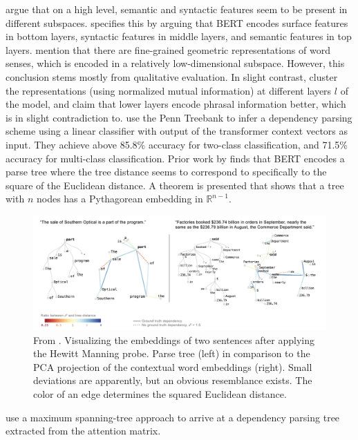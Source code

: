 \documentclass[a4paper,12pt,oneside,openright]{report}
\begin{document}
\cite{coenen19} argue that on a high level, semantic and syntactic features seem to be present in different subspaces.
\cite{jawahar19} specifies this by arguing that BERT encodes surface features in bottom layers, syntactic features in middle layers, and semantic features in top layers.
\cite{coenen19} mention that there are fine-grained geometric representations of word senses, which is encoded in a relatively low-dimensional subspace.
However, this conclusion stems mostly from qualitative evaluation.
In slight contrast, \cite{jawahar19} cluster the representations (using normalized mutual information) at different layers $l$ of the model, and claim that lower layers encode phrasal information better, which is in slight contradiction to.
\cite{coenen19} use the Penn Treebank \cite{marcus93} to infer a dependency parsing scheme using a linear classifier with output of the transformer context vectors as input.
They achieve above 85.8\% accuracy for two-class classification, and 71.5\% accuracy for multi-class classification.
Prior work by \cite{hewitt19} finds that BERT encodes a parse tree where the tree distance seems to correspond to specifically to the square of the Euclidean distance.
A theorem is presented that shows that a tree with $n$ nodes has a Pythagorean embedding in $\mathbb{R}^{n-1}$.

\begin{figure}
	\center
  \includegraphics[width=\linewidth]{./assets/relatedwork/BERT_tree.png}
  \caption{From \cite{coenen19}. Visualizing the embeddings of two sentences after applying the Hewitt Manning probe. Parse tree (left) in comparison to the PCA projection of the contextual word embeddings (right). Small deviations are apparently, but an obvious resemblance exists. The color of an edge determines the squared Euclidean distance.}
  \label{fig:BERT_tree}
\end{figure}

\cite{jawahar19}  use a maximum spanning-tree approach to arrive at a dependency parsing tree extracted from the attention matrix.
\end{document}
